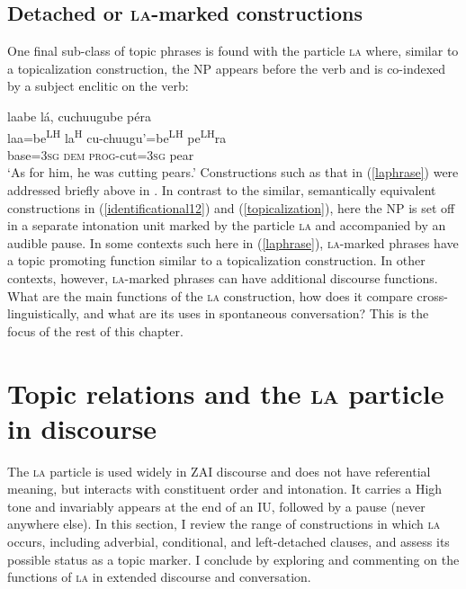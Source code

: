 \subsection{Detached or \textsc{la}-marked constructions}

One final sub-class of topic phrases is found with the particle \textsc{la} where, similar to a topicalization construction, the NP appears before the verb and is co-indexed by a subject enclitic on the verb:

\ea\label{laphrase} 
\glll laabe l\'{a}, cuchuugube p\'{e}ra  \\
laa=be\textsuperscript{LH} la\textsuperscript{H} cu-chuugu'=be\textsuperscript{LH} pe\textsuperscript{LH}ra  \\
base=\textsc{3sg} \textsc{dem} \textsc{prog}-cut=\textsc{3sg} pear  \\
\glt `As for him, he was cutting pears.' 
\z
Constructions such as that in (\ref{laphrase}) were addressed briefly above in . In contrast to the similar, semantically equivalent constructions in (\ref{identificational12}) and (\ref{topicalization}), here the NP is set off in a separate intonation unit marked by the particle \textsc{la} and accompanied by an audible pause. In some contexts such here in (\ref{laphrase}), \textsc{la}-marked phrases have a topic promoting function similar to a topicalization construction. In other contexts, however, \textsc{la}-marked phrases can have additional discourse functions. What are the main functions of the \textsc{la} construction, how does it compare cross-linguistically, and what are its uses in spontaneous conversation? This is the focus of the rest of this chapter.



\section{Topic relations and the \textsc{la} particle in discourse}\label{laparticle}

The \textsc{la} particle is used widely in ZAI discourse and does not have referential meaning, but interacts with constituent order and intonation. It carries a High tone and invariably appears at the end of an IU, followed by a pause (never anywhere else). In this section, I review the range of constructions in which \textsc{la} occurs, including adverbial, conditional, and left-detached clauses, and assess its possible status as a topic marker. I conclude by exploring and commenting on the functions of \textsc{la} in extended discourse and conversation. 

